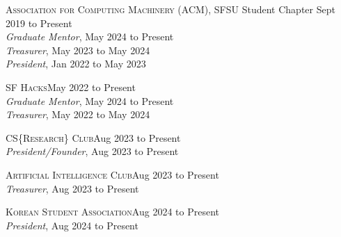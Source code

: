\documentclass[hidelinks, 10.5pt]{article}
\newcommand{\contentwidth}{0.9\linewidth}
\newcommand{\contentspacing}{2.5mm}
\newcommand{\sectionspacing}{8mm}
\begin{document}
{\begin{minipage}[ct]{\contentwidth}
    \textsc{Association for Computing Machinery} (ACM), SFSU Student Chapter\hfill
    Sept 2019 to Present\\
    \emph{Graduate Mentor}, May 2024 to Present\\
    \emph{Treasurer}, May 2023 to May 2024\\
    \emph{President}, Jan 2022 to May 2023
\end{minipage}

\vspace{\contentspacing}

\begin{minipage}[ct]{\contentwidth}
    \textsc{SF Hacks}\hfill May 2022 to Present\\
    \emph{Graduate Mentor}, May 2024 to Present\\
    \emph{Treasurer}, May 2022 to May 2024
\end{minipage}

\vspace{\contentspacing}

\begin{minipage}[ct]{\contentwidth}
    \textsc{CS}\{\textsc{Research}\}\textsc{ Club}\hfill Aug 2023 to Present\\
    \emph{President/Founder}, Aug 2023 to Present
\end{minipage}

\vspace{\contentspacing}

\begin{minipage}[ct]{\contentwidth}
    \textsc{Artificial Intelligence Club}\hfill Aug 2023 to Present\\
    \emph{Treasurer}, Aug 2023 to Present
\end{minipage}

\vspace{\contentspacing}

\begin{minipage}[ct]{\contentwidth}
    \textsc{Korean Student Association}\hfill Aug 2024 to Present\\
    \emph{President}, Aug 2024 to Present
\end{minipage}

\vspace{\sectionspacing}


}
\end{document}
